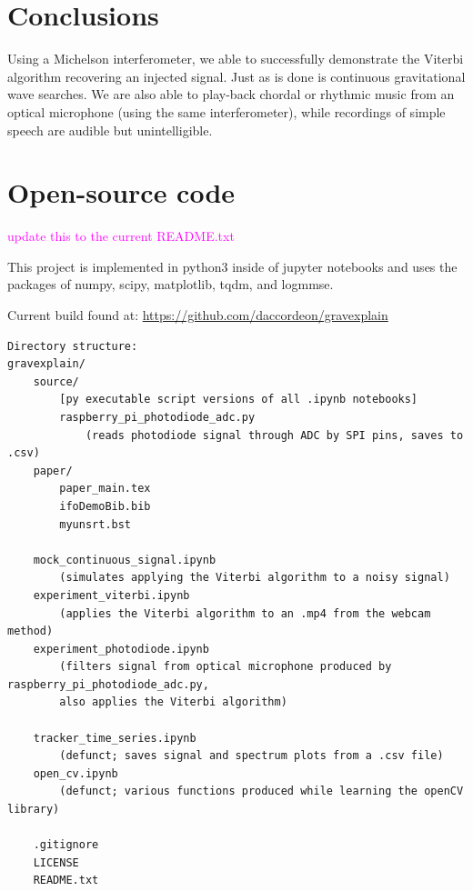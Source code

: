 \documentclass[prb,preprint]{revtex4-1}
\newcommand{\jam}{\textcolor{magenta}}
\begin{document}
\section{Conclusions}

Using a Michelson interferometer, we able to successfully demonstrate the Viterbi algorithm recovering an injected signal. Just as is done is continuous gravitational wave searches. We are also able to play-back chordal or rhythmic music from an optical microphone (using the same interferometer), while recordings of simple speech are audible but unintelligible.

\newpage
\appendix

\section{Open-source code}

\jam{update this to the current README.txt}

This project is implemented in python3\cite{python} inside of jupyter notebooks\cite{jupyter}\cite{ipython} and uses the packages of numpy\cite{numpy}, scipy\cite{scipy}, matplotlib\cite{matplotlib}, tqdm\cite{tqdm}, and logmmse\cite{logmmse}.

Current build found at:
\url{https://github.com/daccordeon/gravexplain}

\begin{verbatim}
Directory structure:
gravexplain/
    source/
        [py executable script versions of all .ipynb notebooks]
        raspberry_pi_photodiode_adc.py
            (reads photodiode signal through ADC by SPI pins, saves to .csv)
    paper/
        paper_main.tex
        ifoDemoBib.bib
        myunsrt.bst
    
    mock_continuous_signal.ipynb
        (simulates applying the Viterbi algorithm to a noisy signal)
    experiment_viterbi.ipynb
        (applies the Viterbi algorithm to an .mp4 from the webcam method)
    experiment_photodiode.ipynb
        (filters signal from optical microphone produced by raspberry_pi_photodiode_adc.py,
        also applies the Viterbi algorithm)

    tracker_time_series.ipynb
        (defunct; saves signal and spectrum plots from a .csv file)
    open_cv.ipynb
        (defunct; various functions produced while learning the openCV library)

    .gitignore
    LICENSE
    README.txt
\end{verbatim}

\end{document}

